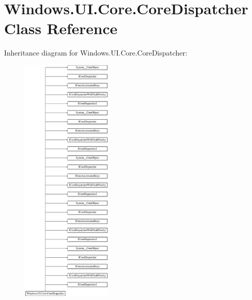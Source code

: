 \hypertarget{class_windows_1_1_u_i_1_1_core_1_1_core_dispatcher}{}\section{Windows.\+U\+I.\+Core.\+Core\+Dispatcher Class Reference}
\label{class_windows_1_1_u_i_1_1_core_1_1_core_dispatcher}
Inheritance diagram for Windows.\+U\+I.\+Core.\+Core\+Dispatcher\+:\begin{figure}[H]
\begin{center}
\leavevmode
\includegraphics[height=12.000000cm]{class_windows_1_1_u_i_1_1_core_1_1_core_dispatcher}
\end{center}
\end{figure}
